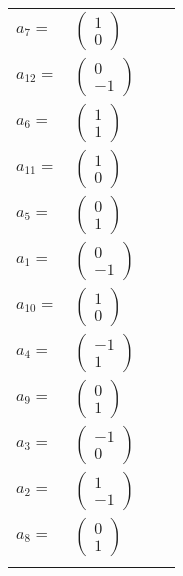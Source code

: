 \documentclass[1p]{elsarticle_modified}
\theoremstyle{definition}
\begin{document}
\begin{tabular}{m{7pt} m{180pt} m{7pt} m{180pt} }
\flushright $a_{7}=$&$\begin{pmatrix}1\\0\end{pmatrix}$ \\
\flushright $a_{12}=$&$\begin{pmatrix}0\\-1\end{pmatrix}$ \\
\flushright $a_{6}=$&$\begin{pmatrix}1\\1\end{pmatrix}$ \\
\flushright $a_{11}=$&$\begin{pmatrix}1\\0\end{pmatrix}$ \\
\flushright $a_{5}=$&$\begin{pmatrix}0\\1\end{pmatrix}$ \\
\flushright $a_{1}=$&$\begin{pmatrix}0\\-1\end{pmatrix}$ \\
\flushright $a_{10}=$&$\begin{pmatrix}1\\0\end{pmatrix}$ \\
\flushright $a_{4}=$&$\begin{pmatrix}-1\\1\end{pmatrix}$ \\
\flushright $a_{9}=$&$\begin{pmatrix}0\\1\end{pmatrix}$ \\
\flushright $a_{3}=$&$\begin{pmatrix}-1\\0\end{pmatrix}$ \\
\flushright $a_{2}=$&$\begin{pmatrix}1\\-1\end{pmatrix}$ \\
\flushright $a_{8}=$&$\begin{pmatrix}0\\1\end{pmatrix}$\\&\end{tabular}
\end{document}
